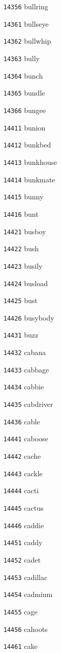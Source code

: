 \documentclass[twoside,11pt]{article}
\begin{document}
\begin{multicols}{5}
\begin{enumerate}
\item[\texttt{14356}] bullring
\item[\texttt{14361}] bullseye
\item[\texttt{14362}] bullwhip
\item[\texttt{14363}] bully
\item[\texttt{14364}] bunch
\item[\texttt{14365}] bundle
\item[\texttt{14366}] bungee
\item[\texttt{14411}] bunion
\item[\texttt{14412}] bunkbed
\item[\texttt{14413}] bunkhouse
\item[\texttt{14414}] bunkmate
\item[\texttt{14415}] bunny
\item[\texttt{14416}] bunt
\item[\texttt{14421}] busboy
\item[\texttt{14422}] bush
\item[\texttt{14423}] busily
\item[\texttt{14424}] busload
\item[\texttt{14425}] bust
\item[\texttt{14426}] busybody
\item[\texttt{14431}] buzz
\item[\texttt{14432}] cabana
\item[\texttt{14433}] cabbage
\item[\texttt{14434}] cabbie
\item[\texttt{14435}] cabdriver
\item[\texttt{14436}] cable
\item[\texttt{14441}] caboose
\item[\texttt{14442}] cache
\item[\texttt{14443}] cackle
\item[\texttt{14444}] cacti
\item[\texttt{14445}] cactus
\item[\texttt{14446}] caddie
\item[\texttt{14451}] caddy
\item[\texttt{14452}] cadet
\item[\texttt{14453}] cadillac
\item[\texttt{14454}] cadmium
\item[\texttt{14455}] cage
\item[\texttt{14456}] cahoots
\item[\texttt{14461}] cake

\end{enumerate}
\end{multicols}
\end{document}
